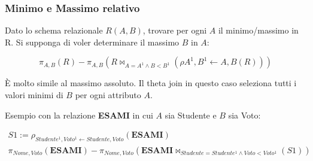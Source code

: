 \subsubsection{Minimo e Massimo relativo}

Dato lo schema relazionale $R(A,B)$, trovare per ogni $A$ il minimo/massimo in R.
Si supponga di voler determinare il massimo $B$ in $A$:

\begin{displaymath}
  \pi_{A,B}(R) - \pi_{A,B}(R \bowtie_{A=A^1 \land B<B^1}(\rho{A^1,B^1 \leftarrow A,B}(R)))
\end{displaymath}

È molto simile al massimo assoluto. Il theta join in questo caso seleziona tutti i valori
minimi di $B$ per ogni attributo $A$.

\noindent
Esempio con la relazione \textbf{ESAMI} in cui $A$ sia Studente e $B$ sia Voto:

\begin{gather*}
  S1 := \rho_{Studente^1,Voto^1 \leftarrow Studente,Voto}(\textbf{ESAMI}) \\
  \pi_{Nome,Voto}(\textbf{ESAMI}) - \pi_{Nome,Voto}(\textbf{ESAMI} \bowtie_{Studente=Studente^1 \land Voto<Voto^1}(S1))
\end{gather*}